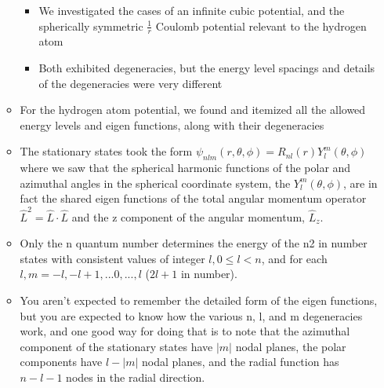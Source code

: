\documentclass{article}
\begin{document}
\begin{itemize}
\begin{itemize}
        \begin{itemize}
            \item We investigated the cases of an infinite cubic potential, and the spherically symmetric $\frac{1}{r}$ Coulomb potential relevant to the hydrogen atom
            
            \item Both exhibited degeneracies, but the energy level spacings and details of the degeneracies were very different
        \end{itemize}
        
        \item For the hydrogen atom potential, we found and itemized all the allowed energy levels and eigen functions, along with their degeneracies
        
        \item The stationary states took the form $\psi_{nlm}(r,\theta,\phi) = R_{nl}(r) Y_l^m(\theta,\phi)$ where we saw that the spherical harmonic functions of the polar and azimuthal angles in the spherical coordinate system, the $Y_l^m(\theta,\phi)$, are in fact the shared eigen functions of the total angular momentum operator $\hat{L}^2 = \hat{L} \cdot \hat{L}$ and the z component of the angular momentum, $\hat{L}_z$.
        
        \item Only the n quantum number determines the energy of the n2 in number states with consistent values of integer $l, 0 \leq l < n$, and for each $l , m=-l, -l+1,...0,...,l$   ($2l+1$ in number).
        
        \item You aren’t expected to remember the detailed form of the eigen functions, but you are expected to know how the various n, l, and m degeneracies work, and one good way for doing that is to note that the azimuthal component of the stationary states have $|m|$ nodal planes, the polar components have $l - |m|$ nodal planes, and the radial function has $n-l-1$ nodes in the radial direction.
        

\end{itemize}
\end{itemize}
\end{document}
